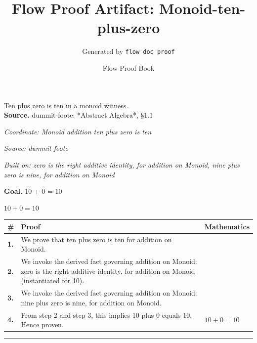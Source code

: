 \documentclass[11pt]{article}
\title{Flow Proof Artifact: Monoid-ten-plus-zero}
\author{Generated by \texttt{flow doc proof}}
\date{Flow Proof Book}
\theoremstyle{definition}
\begin{document}
\maketitle
Ten plus zero is ten in a monoid witness.\\[0.5em]
\textbf{Source.} dummit-foote: *Abstract Algebra*, §1.1\\[0.5em]
\bigskip
{}\par
\smallskip\noindent\textit{Coordinate: Monoid \cdot addition \cdot ten plus zero is ten}\par
\smallskip\noindent\textit{Source: dummit-foote}\par
\smallskip\noindent\textit{Built on: zero is the right additive identity, for addition on Monoid, nine plus zero is nine, for addition on Monoid}\par
\medskip
\noindent\textbf{Goal.} 10 + 0 = 10\par
\noindent$\displaystyle 10 + 0 = 10$\par
\medskip
\noindent
\begin{tabular}{@{} >{\raggedright\arraybackslash}p{} >{\raggedright\arraybackslash}p{} >{\raggedleft\arraybackslash}p{} @{}}
\textbf{\#} & \textbf{Proof} & \textbf{Mathematics} \\
\midrule
\textbf{1.} & We prove that ten plus zero is ten for addition on Monoid. & \\[0.45em]
\textbf{2.} & We invoke the derived fact governing addition on Monoid: zero is the right additive identity, for addition on Monoid (instantiated for 10). & \\[0.45em]
\textbf{3.} & We invoke the derived fact governing addition on Monoid: nine plus zero is nine, for addition on Monoid. & \\[0.45em]
\textbf{4.} & From step 2 and step 3, this implies 10 plus 0 equals 10. Hence proven. & $\displaystyle 10 + 0 = 10$ \\[0.45em]
\bottomrule
\end{tabular}
\label{thm:Monoid-addition-ten_plus_zero_is_ten}
\par\medskip\hrule
\end{document}
